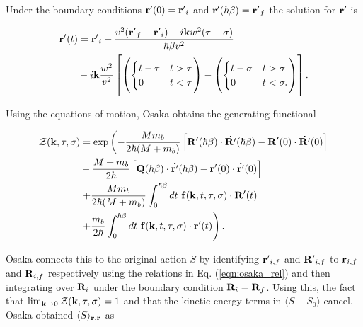 Under the boundary conditions $\vb{r'}(0) = \vb{r'}_i$ and $\vb{r'}(\hbar\beta) = \vb{r'}_f$ the solution for $\vb{r'}$ is

\begin{equation}
    \begin{aligned}
    \vb{r'}(t) &= \vb{r'}_i + \frac{v^2 (\vb{r'}_f - \vb{r'}_i) - i\vb{k}w^2 (\tau - \sigma)}{\hbar\beta v^2} \\
    &- i\vb{k}\frac{w^2}{v^2} \left[
    \left(\begin{cases}
        t - \tau & t > \tau \\
        0 & t < \tau
    \end{cases}\right) - 
    \left(\begin{cases}
        t - \sigma & t > \sigma \\
        0 & t < \sigma.
    \end{cases}\right)
    \right].
    \end{aligned}
\end{equation}

Using the equations of motion, \=Osaka obtains the generating functional

\begin{equation}
    \begin{aligned}
        \mathcal{Z}(\vb{k}, \tau, \sigma) &= \exp \left(  -\frac{M m_b}{2\hbar (M + m_b)} \left[ \vb{R'}(\hbar\beta) \cdot \vb{\dot{R'}}(\hbar\beta) - \vb{R'}(0) \cdot \vb{\dot{R'}}(0) \right] \right. \\ 
        &- \frac{M + m_b}{2\hbar}  \left[ \vb{Q}(\hbar\beta) \cdot \vb{\dot{r'}}(\hbar\beta) - \vb{r'}(0) \cdot \vb{\dot{r'}}(0) \right] \\
        &\left. + \frac{M m_b}{2 \hbar (M + m_b)} \int_0^{\hbar\beta} dt\ \vb{f}(\vb{k}, t, \tau, \sigma) \cdot \vb{R'}(t) \right. \\
        &\left. + \frac{m_b}{2 \hbar} \int_0^{\hbar\beta} dt\ \vb{f}(\vb{k}, t, \tau, \sigma) \cdot \vb{r'}(t) \right).
    \end{aligned}
\end{equation}

\=Osaka connects this to the original action $S$ by identifying $\vb{r'}_{i,f}$ and $\vb{R'}_{i,f}$ to $\vb{r}_{i,f}$ and $\vb{R}_{i,f}$ respectively using the relations in Eq. (\ref{eqn:osaka_rel}) and then integrating over $\vb{R}_i$ under the boundary condition $\vb{R}_i = \vb{R}_f$. Using this, the fact that $\lim_{\vb{k}\to 0} \mathcal{Z}(\vb{k}, \tau, \sigma) = 1$ and that the kinetic energy terms in $\langle S - S_0 \rangle$ cancel, \=Osaka obtained $\langle S \rangle_{\vb{r}, \vb{r}}$ as

